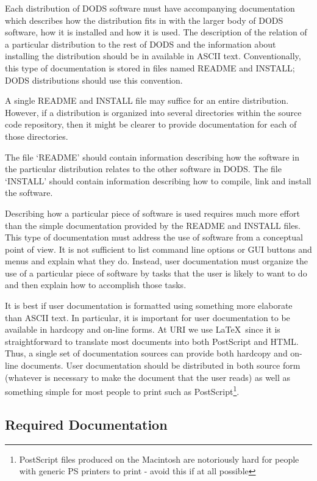 Each distribution of DODS software must have accompanying
documentation which describes how the distribution fits in with the
larger body of DODS software, how it is installed and how it is used.
The description of the relation of a particular distribution to the
rest of DODS and the information about installing the distribution
should be in available in ASCII text. Conventionally, this type of
documentation is stored in files named README and INSTALL; DODS
distributions should use this convention.

A single README and INSTALL file may suffice for an entire
distribution. However, if a distribution is organized into several
directories within the source code repository, then it might be
clearer to provide documentation for each of those directories.

The file `README' should contain information describing how the software in
the particular distribution relates to the other software in DODS. The file
`INSTALL' should contain information describing how to compile, link and
install the software.

Describing how a particular piece of software is used requires much
more effort than the simple documentation provided by the README and
INSTALL files. This type of documentation must address the use of
software from a conceptual point of view. It is not sufficient to list
command line options or GUI buttons and menus and explain what they
do. Instead, user documentation must organize the use of a particular
piece of software by tasks that the user is likely to want to do and
then explain how to accomplish those tasks.

It is best if user documentation is formatted using something more
elaborate than ASCII text. In particular, it is important for user
documentation to be available in hardcopy and on-line forms. At URI we
use \LaTeX\ since it is straightforward to translate most documents
into both PostScript and HTML. Thus, a single set of documentation
sources can provide both hardcopy and on-line documents. User
documentation should be distributed in both source form (whatever is
necessary to make the document that the user reads) as well as
something simple for most people to print such as
PostScript\footnote{PostScript files produced on the Macintosh are
notoriously hard for people with generic PS printers to print - avoid
this if at all possible}.

\subsection{Required Documentation}

